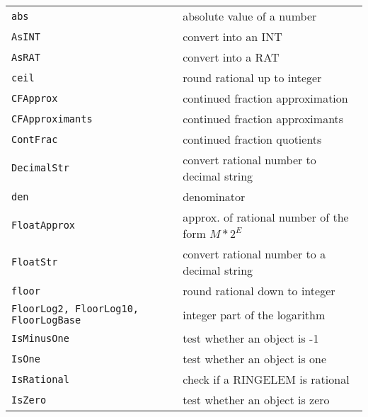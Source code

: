 \documentclass[a4paper]{mybook}
\begin{document}
        

\begin{center}
\begin{longtable}{ll}
   
{\verb~abs~} &
      absolute value of a number\\
   
{\verb~AsINT~} &
      convert into an INT\\
   
{\verb~AsRAT~} &
      convert into a RAT\\
   
{\verb~ceil~} &
      round rational up to integer\\
   
{\verb~CFApprox~} &
      continued fraction approximation\\
   
{\verb~CFApproximants~} &
      continued fraction approximants\\
   
{\verb~ContFrac~} &
      continued fraction quotients\\
   
{\verb~DecimalStr~} &
      convert rational number to decimal string\\
   
{\verb~den~} &
      denominator\\
   
{\verb~FloatApprox~} &
      approx. of rational number of the form $M*2^E$\\
   
{\verb~FloatStr~} &
      convert rational number to a decimal string\\
   
{\verb~floor~} &
      round rational down to integer\\
   
{\verb~FloorLog2, FloorLog10, FloorLogBase~} &
      integer part of the logarithm\\
   
{\verb~IsMinusOne~} &
      test whether an object is -1\\
   
{\verb~IsOne~} &
      test whether an object is one\\
   
{\verb~IsRational~} &
      check if a RINGELEM is rational\\
   
{\verb~IsZero~} &
      test whether an object is zero\\
   

\end{longtable}
\end{center}
\end{document}
